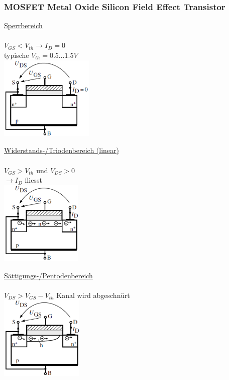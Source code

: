             \subsubsection{MOSFET Metal Oxide Silicon Field Effect Transistor}
            \begin{minipage}[T]{6cm}
                \underline{Sperrbereich}\\\\
                $V_{GS} < V_{th} \to I_D = 0$\\
                typische $V_{th} = 0.5 … 1.5V$\\ 
                \includegraphics[height=4cm]{./bilder/MOSFETSperrbereich.png}
            \end{minipage}
            \begin{minipage}[T]{6cm}
                \underline{Widerstands-/Triodenbereich (linear)}\\\\
                $V_{GS} > V_{th} $ und $V_{DS}>0$\\
                $\to I_D$ fliesst\\
                \includegraphics[height=4cm]{./bilder/MOSFETLinBereich.png}
            \end{minipage}
            \begin{minipage}[T]{6cm}
                \underline{S\"attigungs-/Pentodenbereich}\\\\
                $V_{DS} > V_{GS} - V_{th}$ Kanal wird abgeschn\"urt\\
                \includegraphics[height=4cm]{./bilder/MOSFETSaettBereich.png}
            \end{minipage}\\
            
